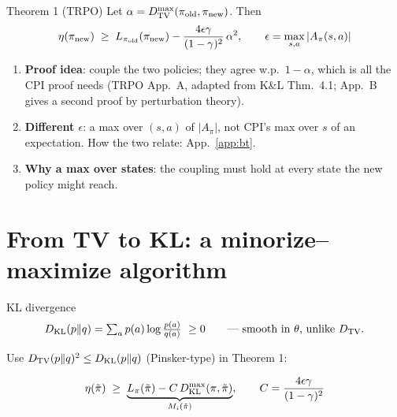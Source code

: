 \begin{thmbox}{Theorem 1 (TRPO)}
Let $\alpha=D_{\mathrm{TV}}^{\max}(\pi_{\mathrm{old}},\pi_{\mathrm{new}})$. Then
\begin{gather*}
  \eta(\pi_{\mathrm{new}}) \;\ge\; L_{\pi_{\mathrm{old}}}(\pi_{\mathrm{new}}) - \frac{4\epsilon\gamma}{(1-\gamma)^2}\,\alpha^2,
  \qquad \epsilon = \max_{s,a}|A_\pi(s,a)|
\end{gather*}
\end{thmbox}

\begin{enumerate}
  \item \textbf{Proof idea}: couple the two policies; they agree w.p.\ $1-\alpha$, which is all the CPI proof needs (TRPO App.~A, adapted from K\&L Thm.~4.1; App.~B gives a second proof by perturbation theory).
  \item \textbf{Different $\epsilon$}: a max over $(s,a)$ of $|A_\pi|$, not CPI's max over $s$ of an expectation. How the two relate: App.~\ref{app:bt}.
  \item \textbf{Why a max over states}: the coupling must hold at every state the new policy might reach.
\end{enumerate}

\section{From TV to KL: a minorize--maximize algorithm}

\begin{defbox}{KL divergence}
\begin{gather*}
  D_{\mathrm{KL}}(p\|q)=\textstyle\sum_a p(a)\log\frac{p(a)}{q(a)}\ \ge 0 \qquad \text{--- smooth in $\theta$, unlike $D_{\mathrm{TV}}$.}
\end{gather*}
\end{defbox}

Use $D_{\mathrm{TV}}(p\|q)^2\le D_{\mathrm{KL}}(p\|q)$ (Pinsker-type) in Theorem 1:

\begin{eqbox}
\begin{gather*}
  \eta(\tilde\pi) \;\ge\; \underbrace{L_\pi(\tilde\pi) - C\,D_{\mathrm{KL}}^{\max}(\pi,\tilde\pi)}_{M_i(\tilde\pi)},
  \qquad C = \frac{4\epsilon\gamma}{(1-\gamma)^2}
\end{gather*}
\end{eqbox}

